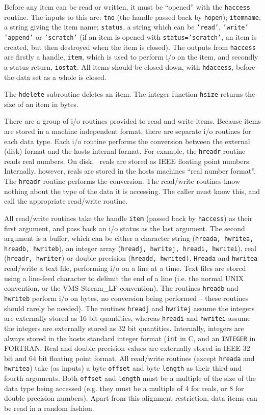 Before any item can be read or written, it must be ``opened'' with the
{\tt haccess} routine. The inputs to this are: {\tt tno} (the handle passed
back by {\tt hopen}); {\tt itemname}, a string giving the item name;
{\tt status}, a string which can be {\tt 'read'}, {\tt 'write'} {\tt 'append'}
or {\tt 'scratch'} (if an item is opened with {\tt status='scratch'}, an item
is created, but then destroyed when the item is closed). The outputs from
{\tt haccess} are firstly a handle, {\tt item}, which is used to perform i/o on
the item, and secondly a status return, {\tt iostat}. All items should be
closed down, with {\tt hdaccess}, before the data set as a whole is closed. 

The {\tt hdelete} subroutine deletes an item.
The integer function {\tt hsize} returns the size of an item in bytes.

There are a group of i/o routines provided to read and write items. Because
items are stored in a machine independent format, there are separate i/o
routines for each data type.  Each i/o routine performs the conversion between
the external (disk) format and the hosts internal format. For example, the
{\tt hreadr} routine reads real numbers. On disk, \miriad\ reals are stored
as IEEE floating point numbers. Internally, however, reals are stored in the
hosts machines ``real number format''. The {\tt hreadr} routine performs the
conversion. The read/write
routines know nothing about the type of the data it is accessing. The
caller must know this, and call the appropriate read/write routine.

All read/write routines take the handle {\tt item} (passed back by
{\tt haccess}) as their first argument, and pass back an i/o status as the last
argument. The second argument is a buffer, which can be either a character
string ({\tt hreada, hwritea, hreadb, hwriteb}), an integer array ({\tt hreadj,
hwritej, hreadi, hwritei}), real ({\tt hreadr, hwriter}) or double precision
({\tt hreadd, hwrited)}. {\tt Hreada} and {\tt hwritea} read/write a text file,
performing i/o on a line at a time. Text files are stored using a line-feed
character to delimit the end of a line (i.e. the normal UNIX convention, or the
VMS Stream\_LF convention). The routines {\tt hreadb} and {\tt hwriteb} perform
i/o on bytes, no conversion being performed -- these routines should rarely be
needed). The routines {\tt hreadj} and {\tt hwritej} assume the integers are
externally stored as 16 bit quantities, whereas {\tt hreadi} and {\tt hwritei}
assume the integers are externally stored as 32 bit quantities. Internally,
integers are always stored in the hosts standard integer format ({\tt int}
in C, and an {\tt INTEGER} in FORTRAN. Real and double
precision values are externally stored in IEEE 32 bit and 64 bit floating point
format. All read/write routines (except {\tt hreada} and {\tt hwritea}) take
(as inputs) a byte {\tt offset} and byte {\tt length} as their third and fourth
arguments. Both {\tt offset} and {\tt length} must be a multiple of the size
of the data type being accessed (e.g. they must be a multiple of 4 for
reals, or 8 for double precision numbers). Apart from this alignment
restriction, data items can be read in a random fashion.

